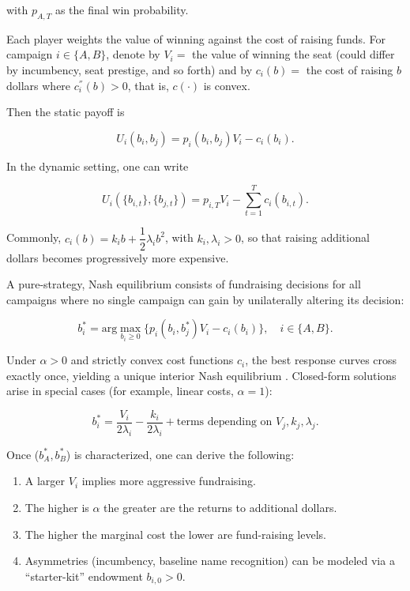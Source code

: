 \noindent with $p_{A,T}$ as the final win probability.

Each player weights the value of winning against the cost of raising funds. For campaign $i \in \{A, B \}$, denote by $V_i =$ the value of winning the seat (could differ by incumbency, seat prestige, and so forth) and by $c_i (b) =$ the cost of raising $b$ dollars where $c_i^{''} (b) > 0$, that is, $c(\cdot)$ is convex.

\noindent Then the static payoff is

\[ U_i (b_i, b_j) = p_i (b_i, b_j) V_i - c_i (b_i). \]

\noindent In the dynamic setting, one can write

\[ U_i ( \{b_{i,t} \}, \{b_{j,t} \}) = p_{i,T} V_i - \sum\limits_{t=1}^T c_i (b_{i,t}). \]

Commonly, $c_i (b) = k_i b + \dfrac{1}{2} \lambda_i b^2$, with $k_i, \lambda_i > 0$, so that raising additional dollars becomes progressively more expensive.

A pure-strategy, Nash equilibrium consists of fundraising decisions for all campaigns where no single campaign can gain by unilaterally altering its decision:

\[ b_i^* = \text{arg} \underset{b_i \geq 0}{\max} \Big\{ p_i (b_i, b_j^*) V_i - c_i (b_i) \Big\}, \hspace{1em} i \in \{A, B \}. \]

Under $\alpha > 0$ and strictly convex cost functions $c_i$, the best response curves cross exactly once, yielding a unique interior Nash equilibrium \cite{bayes}. Closed-form solutions arise in special cases (for example, linear costs, $\alpha = 1$):

\[ b_i^* = \dfrac{V_i}{2 \lambda_i} - \dfrac{k_i}{2 \lambda_i} + \text{terms depending on } V_j, k_j, \lambda_j. \]

\noindent Once ($b_A^*, b_B^*$) is characterized, one can derive the following:

\begin{enumerate}
	\item A larger $V_i$ implies  more aggressive fundraising.
	\item The higher is $\alpha$ the greater are the returns to additional dollars.
	\item The higher the marginal cost the lower are fund-raising levels.
	\item Asymmetries (incumbency, baseline name recognition) can be modeled via a ``starter-kit'' endowment $b_{i,0} > 0$.
\end{enumerate}

